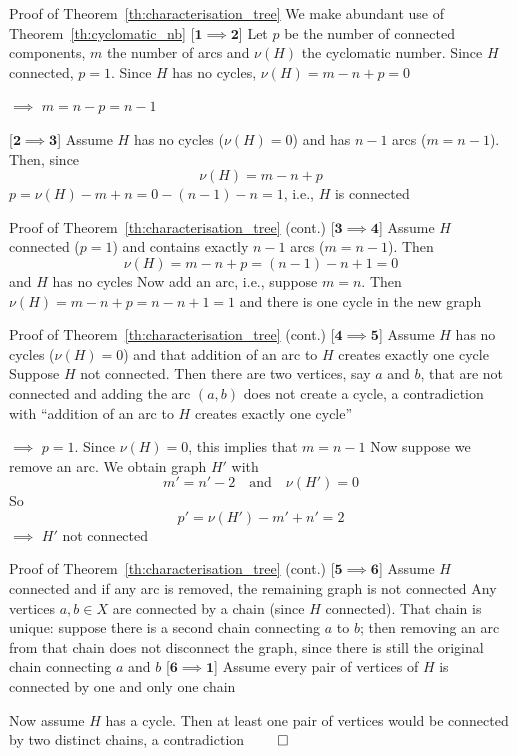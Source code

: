 \documentclass[aspectratio=43]{beamer}
\begin{document}
\begin{frame}{Proof of Theorem~\ref{th:characterisation_tree}}
We make abundant use of Theorem~\ref{th:cyclomatic_nb}
\vfill
[$\mathbf{1\implies 2}$] 
Let $p$ be the number of connected components, $m$ the number of arcs and $\nu(H)$ the cyclomatic number. Since $H$ connected, $p=1$. Since $H$ has no cycles, $\nu(H)=m-n+p=0$

$\implies$ $m=n-p=n-1$
\vfill

[$\mathbf{2\implies 3}$] 
Assume $H$ has no cycles ($\nu(H)=0$) and has $n-1$ arcs ($m=n-1$). Then, since
\[
\nu(H)=m-n+p
\]
$p=\nu(H)-m+n=0-(n-1)-n=1$, i.e., $H$ is connected
\end{frame}

\begin{frame}{Proof of Theorem~\ref{th:characterisation_tree} (cont.)}
[$\mathbf{3\implies 4}$]
Assume $H$ connected ($p=1$) and contains exactly $n-1$ arcs ($m=n-1$). Then
\[
\nu(H)=m-n+p=(n-1)-n+1=0
\]
and $H$ has no cycles
\vskip0.5cm
Now add an arc, i.e., suppose $m=n$. Then $\nu(H)=m-n+p=n-n+1=1$ and there is one cycle in the new graph
\end{frame}


\begin{frame}{Proof of Theorem~\ref{th:characterisation_tree} (cont.)}
[$\mathbf{4\implies 5}$]
Assume $H$ has no cycles ($\nu(H)=0$) and that addition of an arc to $H$ creates exactly one cycle
\vskip0.5cm
Suppose $H$ not connected. Then there are two vertices, say $a$ and $b$, that are not connected and adding the arc $(a,b)$ does not create a cycle, a contradiction with ``addition of an arc to $H$ creates exactly one cycle'' 

$\implies$ $p=1$. Since $\nu(H)=0$, this implies that $m=n-1$
\vskip0.5cm
Now suppose we remove an arc. We obtain graph $H'$ with
\[
m'=n'-2\quad\text{and}\quad \nu(H')=0
\]
So
\[
p'=\nu(H')-m'+n'=2
\]
$\implies$ $H'$ not connected
\end{frame}

\begin{frame}{Proof of Theorem~\ref{th:characterisation_tree} (cont.)}
[$\mathbf{5\implies 6}$]
Assume $H$ connected and if any arc is removed, the remaining graph is not connected
\vskip0.5cm
Any vertices $a,b\in X$ are connected by a chain (since $H$ connected). That chain is unique: suppose there is a second chain connecting $a$ to $b$; then removing an arc from that chain does not disconnect the graph, since there is still the original chain connecting $a$ and $b$
\vfill
[$\mathbf{6\implies 1}$]
Assume every pair of vertices of $H$ is connected by one and only one chain

Now assume $H$ has a cycle. Then at least one pair of vertices would be connected by two distinct chains, a contradiction
$\qed$
\end{frame}
\end{document}
